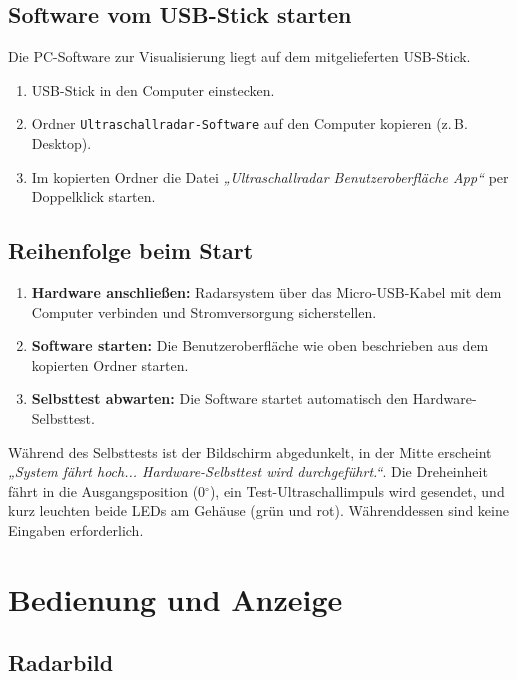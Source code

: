 \documentclass[a4paper,11pt]{article}
\begin{document}
	\subsection{Software vom USB-Stick starten}
	
	Die PC-Software zur Visualisierung liegt auf dem mitgelieferten USB-Stick. 
	
	\begin{enumerate}
		\item USB-Stick in den Computer einstecken.
		\item Ordner \texttt{Ultraschallradar-Software} auf den Computer kopieren (z.\,B. Desktop).
		\item Im kopierten Ordner die Datei \textit{„Ultraschallradar Benutzeroberfläche App“} per Doppelklick starten.
	\end{enumerate}
	
	\subsection{Reihenfolge beim Start}
	
	\begin{enumerate}
		\item \textbf{Hardware anschlie\ss en:} Radarsystem über das Micro-USB-Kabel mit dem Computer verbinden und Stromversorgung sicherstellen. 
		\item \textbf{Software starten:} Die Benutzeroberfläche wie oben beschrieben aus dem kopierten Ordner starten. 
		\item \textbf{Selbsttest abwarten:} Die Software startet automatisch den Hardware-Selbsttest.
	\end{enumerate}
	
	Während des Selbsttests ist der Bildschirm abgedunkelt, in der Mitte erscheint \textit{„System fährt hoch... Hardware-Selbsttest wird durchgeführt.“}. 
	Die Dreheinheit fährt in die Ausgangsposition (0\(^\circ\)), ein Test-Ultraschallimpuls wird gesendet, und kurz leuchten beide LEDs am Gehäuse (grün und rot). 
	Währenddessen sind keine Eingaben erforderlich.
	
	\newpage
	
	\section{Bedienung und Anzeige}
	
	\subsection{Radarbild}
	
\end{document}
